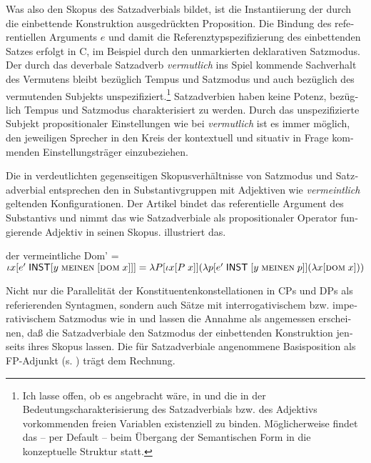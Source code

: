 \documentclass[output=paper, colorlinks, citecolor=brown, booklanguage=german]{langscibook}
\begin{document}
\begin{otherlanguage}{german}
\noindent Was also den Skopus des Satzadverbials bildet, ist die Instantiierung der durch die einbettende Konstruktion ausgedrückten Proposition. Die Bindung des referentiellen Arguments $e$ und damit die Referenztypspezifizierung des einbettenden Satzes erfolgt in C, im Beispiel  durch den unmarkierten deklarativen Satzmodus. Der durch das deverbale Satzadverb \textit{vermutlich} ins Spiel kommende Sachverhalt des Vermutens bleibt bezüglich Tempus und Satzmodus und auch bezüglich des vermutenden Subjekts unspezifiziert.\footnote{Ich lasse offen, ob es angebracht wäre, in  und  die in der Bedeutungscharakterisierung des Satzadverbials bzw. des Adjektivs vorkommenden freien Variablen existenziell zu binden. Möglicherweise findet das -- per Default -- beim Übergang der Semantischen Form in die konzeptuelle Struktur statt.} Satzadverbien haben keine Potenz, bezüglich Tempus und Satzmodus charakterisiert zu werden. Durch das unspezifizierte Subjekt propositionaler Einstellungen wie bei \textit{vermutlich} ist es immer möglich, den jeweiligen Sprecher in den Kreis der kontextuell und situativ in Frage kommenden Einstellungsträger einzubeziehen.

Die in  verdeutlichten gegenseitigen Skopusverhältnisse von Satzmodus und Satzadverbial entsprechen den in Substantivgruppen mit Adjektiven wie \textit{vermeintlich} geltenden Konfigurationen. Der Artikel bindet das referentielle Argument des Substantivs und nimmt das wie Satzadverbiale als propositionaler Operator fungierende Adjektiv in seinen Skopus.  illustriert das.

\ea \label{ex:zi97:43} der vermeintliche Dom' = \\
$\iota x [e' \; \cnst{inst} [y \; \textsc{meinen}  \; [\textsc{dom} \; x]]] = \newline \lambda P [\iota x [P \; x]](\lambda p [e' \; \cnst{inst}  \; [y \; \textsc{meinen} \; p]] (\lambda x [\textsc{dom} \; x]))$
\z 

\noindent Nicht nur die Parallelität der Konstituentenkonstellationen in CPs und DPs als referierenden Syntagmen, sondern auch Sätze mit interrogativischem bzw. imperativischem Satzmodus wie in  und  lassen die Annahme als angemessen erscheinen, daß die Satzadverbiale den Satzmodus der einbettenden Konstruktion jenseits ihres Skopus lassen. Die für Satzadverbiale angenommene Basisposition als FP-Adjunkt (s. ) trägt dem Rechnung.


\end{otherlanguage}
\end{document}
